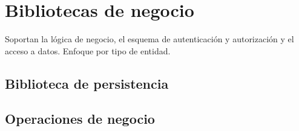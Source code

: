 \chapter{Bibliotecas de negocio}

Soportan la lógica de negocio, el esquema de autenticación y autorización y el acceso a datos. Enfoque por tipo de entidad.

\section{Biblioteca de persistencia}


\section{Operaciones de negocio}